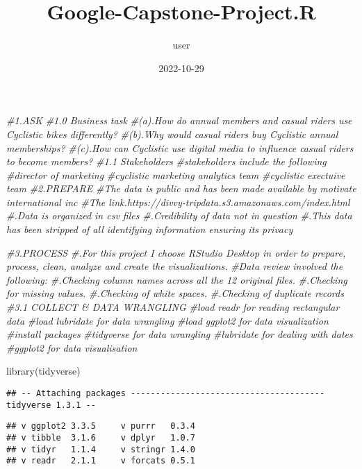 \documentclass[
]{article}
\title{Google-Capstone-Project.R}
\author{user}
\date{2022-10-29}
\newenvironment{Shaded}{\begin{snugshade}}{\end{snugshade}}
\newcommand{\CommentTok}[1]{\textcolor[rgb]{0.56,0.35,0.01}{\textit{#1}}}
\newcommand{\FunctionTok}[1]{\textcolor[rgb]{0.00,0.00,0.00}{#1}}
\newcommand{\NormalTok}[1]{#1}
\begin{document}
\maketitle

\begin{Shaded}
\begin{Highlighting}[]
\CommentTok{\#1.ASK}
\CommentTok{\#1.0 Business task}
\CommentTok{\#(a).How do annual members and casual riders use Cyclistic bikes differently?}
\CommentTok{\#(b).Why would casual riders buy Cyclistic annual memberships?}
\CommentTok{\#(c).How can Cyclistic use digital media to influence casual riders to become members?}
\CommentTok{\#1.1 Stakeholders}
\CommentTok{\#stakeholders include the following}
\CommentTok{\#director of marketing}
\CommentTok{\#cyclistic marketing analytics team}
\CommentTok{\#cyclistic exectuive team}
\CommentTok{\#2.PREPARE}
\CommentTok{\#The data is public and has been made available by motivate international inc}
\CommentTok{\#The link.https://divvy{-}tripdata.s3.amazonaws.com/index.html}
\CommentTok{\#.Data is organized in csv files}
\CommentTok{\#.Credibility of data not in question}
\CommentTok{\#.This data has been stripped of all identifying information ensuring its privacy}

\CommentTok{\#3.PROCESS}
\CommentTok{\#.For this project I choose RStudio Desktop in order to prepare, process, clean, analyze and create the visualizations.}
\CommentTok{\#Data review involved the following:}
\CommentTok{\#.Checking column names across all the 12 original files.}
\CommentTok{\#.Checking for missing values.}
\CommentTok{\#.Checking of white spaces.}
\CommentTok{\#.Checking of duplicate records}
\CommentTok{\#3.1 COLLECT \& DATA WRANGLING}
\CommentTok{\#load readr for reading rectangular data}
\CommentTok{\#load lubridate for data wrangling}
\CommentTok{\#load ggplot2 for data visualization}
\CommentTok{\#install packages}
\CommentTok{\#tidyverse for data wrangling}
\CommentTok{\#lubridate for dealing with dates}
\CommentTok{\#ggplot2 for data visualisation}

\FunctionTok{library}\NormalTok{(tidyverse)}
\end{Highlighting}
\end{Shaded}

\begin{verbatim}
## -- Attaching packages --------------------------------------- tidyverse 1.3.1 --
\end{verbatim}

\begin{verbatim}
## v ggplot2 3.3.5     v purrr   0.3.4
## v tibble  3.1.6     v dplyr   1.0.7
## v tidyr   1.1.4     v stringr 1.4.0
## v readr   2.1.1     v forcats 0.5.1
\end{verbatim}
\end{document}
